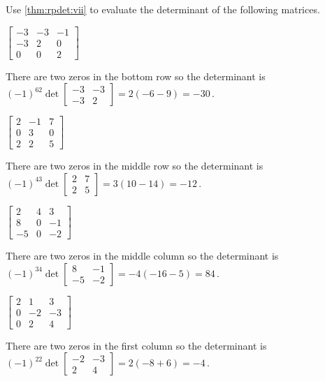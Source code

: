 \begin{example} \label{eg:rpdet}
Use \autoref{thm:rpdet:vii} to evaluate the determinant of the following matrices.  
\begin{parts}
\item \(\begin{bmatrix} -3&-3&-1\\-3&2&0\\0&0&2 \end{bmatrix}\)
\begin{solution} 
There are two zeros in the bottom row so the determinant is \((-1)^62\det\begin{bmatrix} -3&-3\\-3&2 \end{bmatrix}=2(-6-9)=-30\)\,. 
\end{solution}

\item \(\begin{bmatrix} 2&-1&7\\0&3&0\\2&2&5 \end{bmatrix}\)
\begin{solution} 
There are two zeros in the middle row so the determinant is \((-1)^43\det\begin{bmatrix} 2&7\\2&5 \end{bmatrix}=3(10-14)=-12\)\,. 
\end{solution}

\item \(\begin{bmatrix} 2&4&3\\8&0&-1\\-5&0&-2 \end{bmatrix}\)
\begin{solution} 
There are two zeros in the middle column so the determinant is \((-1)^34\det\begin{bmatrix} 8&-1\\-5&-2 \end{bmatrix}=-4(-16-5)=84\)\,. 
\end{solution}

\item \(\begin{bmatrix} 2&1&3\\0&-2&-3\\0&2&4 \end{bmatrix}\)
\begin{solution} 
There are two zeros in the first column so the determinant is \((-1)^22\det\begin{bmatrix} -2&-3\\2&4 \end{bmatrix}=2(-8+6)=-4\)\,. 
\end{solution}

\end{parts}
\end{example}




